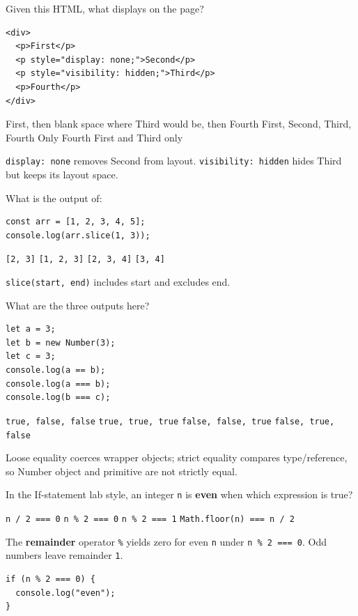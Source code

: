 \question[4]
Given this HTML, what displays on the page?
\begin{lstlisting}[style=htmlexam]
<div>
  <p>First</p>
  <p style="display: none;">Second</p>
  <p style="visibility: hidden;">Third</p>
  <p>Fourth</p>
</div>
\end{lstlisting}
\begin{choices}
  \CorrectChoice First, then blank space where Third would be, then Fourth
  \choice First, Second, Third, Fourth
  \choice Only Fourth
  \choice First and Third only
\end{choices}
\begin{solution}
  \texttt{display: none} removes Second from layout. \texttt{visibility: hidden} hides Third but keeps its layout space.
\end{solution}

\question[4]
What is the output of:
\begin{lstlisting}[style=jsexam]
const arr = [1, 2, 3, 4, 5];
console.log(arr.slice(1, 3));
\end{lstlisting}
\begin{choices}
  \CorrectChoice \texttt{[2, 3]}
  \choice \texttt{[1, 2, 3]}
  \choice \texttt{[2, 3, 4]}
  \choice \texttt{[3, 4]}
\end{choices}
\begin{solution}
  \texttt{slice(start, end)} includes start and excludes end.
\end{solution}

\question[4]
What are the three outputs here?
\begin{lstlisting}[style=jsexam]
let a = 3;
let b = new Number(3);
let c = 3;
console.log(a == b);
console.log(a === b);
console.log(b === c);
\end{lstlisting}
\begin{choices}
  \CorrectChoice \texttt{true, false, false}
  \choice \texttt{true, true, true}
  \choice \texttt{false, false, true}
  \choice \texttt{false, true, false}
\end{choices}
\begin{solution}
  Loose equality coerces wrapper objects; strict equality compares type/reference, so Number object and primitive are not strictly equal.
\end{solution}

\question[4]
In the If-statement lab style, an integer \texttt{n} is \textbf{even} when which expression is true?
\begin{choices}
  \choice \texttt{n / 2 === 0}
  \CorrectChoice \texttt{n \% 2 === 0}
  \choice \texttt{n \% 2 === 1}
  \choice \texttt{Math.floor(n) === n / 2}
\end{choices}
\begin{solution}
  The \textbf{remainder} operator \texttt{\%} yields zero for even \texttt{n} under \texttt{n \% 2 === 0}. Odd numbers leave remainder \texttt{1}.
\begin{lstlisting}[style=jsexam]
if (n % 2 === 0) {
  console.log("even");
}
\end{lstlisting}
\end{solution}

